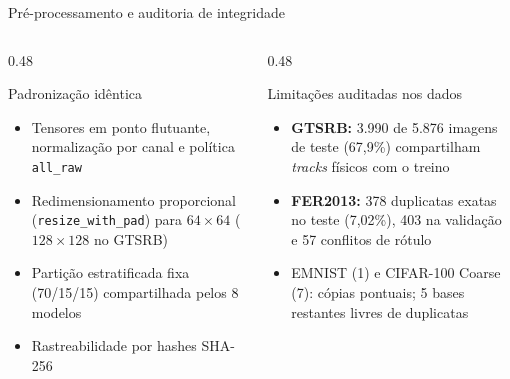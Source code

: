 \documentclass[aspectratio=169,11pt,brazil]{beamer}
\begin{document}
\begin{frame}{Pré-processamento e auditoria de integridade}
  \begin{columns}[T,onlytextwidth]
    \begin{column}{0.48\textwidth}
      \begin{block}{Padronização idêntica}
        \begin{itemize}\setlength{\itemsep}{4pt}
          \item Tensores em ponto flutuante, normalização por canal e política \texttt{all\_raw}
          \item Redimensionamento proporcional (\texttt{resize\_with\_pad}) para $64\times 64$ ($128\times 128$ no GTSRB)
          \item Partição estratificada fixa (70/15/15) compartilhada pelos 8 modelos
          \item Rastreabilidade por hashes SHA-256
        \end{itemize}
      \end{block}
    \end{column}
    \begin{column}{0.48\textwidth}
      \begin{alertblock}{Limitações auditadas nos dados}
        \begin{itemize}\setlength{\itemsep}{5pt}
          \item \textcolor{badred}{\textbf{GTSRB:}} 3.990 de 5.876 imagens de teste (67,9\%) compartilham \textit{tracks} físicos com o treino
          \item \textcolor{badred}{\textbf{FER2013:}} 378 duplicatas exatas no teste (7,02\%), 403 na validação e 57 conflitos de rótulo
          \item EMNIST (1) e CIFAR-100 Coarse (7): cópias pontuais; 5 bases restantes livres de duplicatas
        \end{itemize}
      \end{alertblock}
    \end{column}
  \end{columns}
\end{frame}
\end{document}
